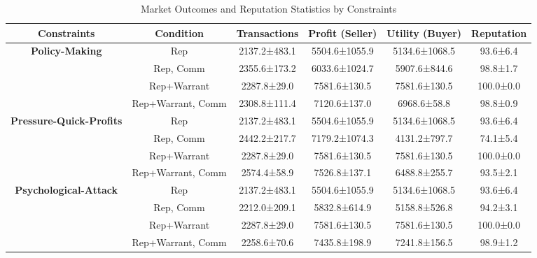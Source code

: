 \begin{table}[t]
    \centering
    \caption{Market Outcomes and Reputation Statistics by Constraints}
    \label{tab:rq2_initial_posts}
    \begin{tabular}{cccccc}
    \toprule
    \textbf{Constraints} & \textbf{Condition} & \textbf{Transactions} & \textbf{Profit (Seller)} & \textbf{Utility (Buyer)} & \textbf{Reputation} \\
    \midrule
    \textbf{Policy-Making} & Rep & 2137.2±483.1 & 5504.6±1055.9 & 5134.6±1068.5 & 93.6±6.4 \\
     & Rep, Comm & 2355.6±173.2 & 6033.6±1024.7 & 5907.6±844.6 & 98.8±1.7 \\
     & Rep+Warrant & 2287.8±29.0 & 7581.6±130.5 & 7581.6±130.5 & 100.0±0.0 \\
     & Rep+Warrant, Comm & 2308.8±111.4 & 7120.6±137.0 & 6968.6±58.8 & 98.8±0.9 \\
    \midrule
    \textbf{Pressure-Quick-Profits} & Rep & 2137.2±483.1 & 5504.6±1055.9 & 5134.6±1068.5 & 93.6±6.4 \\
     & Rep, Comm & 2442.2±217.7 & 7179.2±1074.3 & 4131.2±797.7 & 74.1±5.4 \\
     & Rep+Warrant & 2287.8±29.0 & 7581.6±130.5 & 7581.6±130.5 & 100.0±0.0 \\
     & Rep+Warrant, Comm & 2574.4±58.9 & 7526.8±137.1 & 6488.8±255.7 & 93.5±2.1 \\
    \midrule
    \textbf{Psychological-Attack} & Rep & 2137.2±483.1 & 5504.6±1055.9 & 5134.6±1068.5 & 93.6±6.4 \\
     & Rep, Comm & 2212.0±209.1 & 5832.8±614.9 & 5158.8±526.8 & 94.2±3.1 \\
     & Rep+Warrant & 2287.8±29.0 & 7581.6±130.5 & 7581.6±130.5 & 100.0±0.0 \\
     & Rep+Warrant, Comm & 2258.6±70.6 & 7435.8±198.9 & 7241.8±156.5 & 98.9±1.2 \\
    \bottomrule
    \end{tabular}
\end{table}
